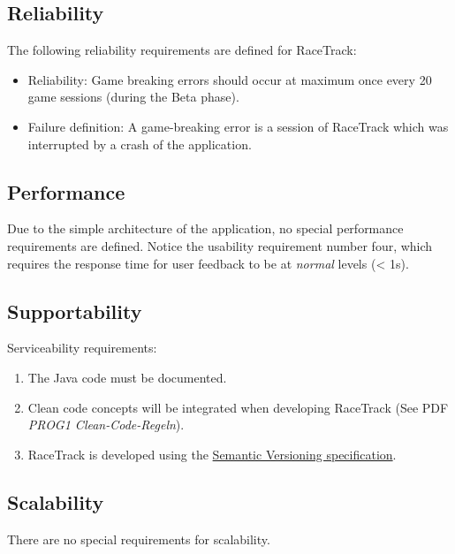     \subsection{Reliability}
        The following reliability requirements are defined for RaceTrack:
        \begin{itemize}
            \item Reliability: Game breaking errors should occur at maximum once every 20 game sessions (during the Beta phase).
            \item Failure definition: A game-breaking error is a session of RaceTrack which was interrupted by a crash of the application.
        \end{itemize}

    \subsection{Performance}
        Due to the simple architecture of the application, no special performance requirements are defined. Notice the usability requirement number four, which requires the response time for user feedback to be at \textit{normal} levels (< 1s).

    \subsection{Supportability}
        Serviceability requirements:
        \begin{enumerate}
            \item The Java code must be documented.
            \item Clean code concepts will be integrated when developing RaceTrack (See PDF \textit{PROG1 Clean-Code-Regeln}).
            \item RaceTrack is developed using the \href{https://semver.org/}{Semantic Versioning specification}.
        \end{enumerate}

    \subsection{Scalability}
        There are no special requirements for scalability.
